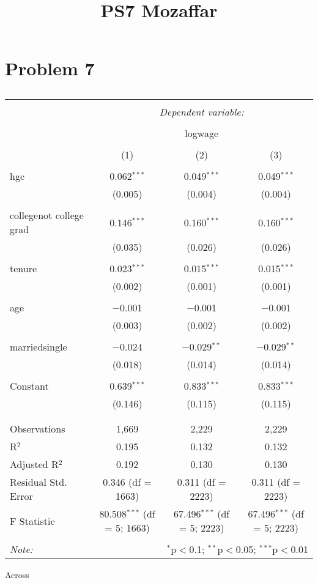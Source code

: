 \documentclass{article} \usepackage[utf8]{inputenc} \title{PS7 Mozaffar}
\begin{document}
\bigskip \section{Problem 7} \begin{table}[!htbp] \centering
  \caption{}
  \label{} \begin{tabular}{@{\extracolsep{5pt}}lccc} \\[-1.8ex]\hline 
\hline \\[-1.8ex]
 & \multicolumn{3}{c}{\textit{Dependent variable:}} \\ \cline{2-4} 
\\[-1.8ex] & \multicolumn{3}{c}{logwage} \\ \\[-1.8ex] & (1) & (2) & 
(3)\\ \hline \\[-1.8ex]
 hgc & 0.062$^{***}$ & 0.049$^{***}$ & 0.049$^{***}$ \\
  & (0.005) & (0.004) & (0.004) \\
  & & & \\
 collegenot college grad & 0.146$^{***}$ & 0.160$^{***}$ & 0.160$^{***}$ 
\\
  & (0.035) & (0.026) & (0.026) \\
  & & & \\
 tenure & 0.023$^{***}$ & 0.015$^{***}$ & 0.015$^{***}$ \\
  & (0.002) & (0.001) & (0.001) \\
  & & & \\
 age & $-$0.001 & $-$0.001 & $-$0.001 \\
  & (0.003) & (0.002) & (0.002) \\
  & & & \\
 marriedsingle & $-$0.024 & $-$0.029$^{**}$ & $-$0.029$^{**}$ \\
  & (0.018) & (0.014) & (0.014) \\
  & & & \\
 Constant & 0.639$^{***}$ & 0.833$^{***}$ & 0.833$^{***}$ \\
  & (0.146) & (0.115) & (0.115) \\
  & & & \\ \hline \\[-1.8ex] Observations & 1,669 & 2,229 & 2,229 \\ 
R$^{2}$ & 0.195 & 0.132 & 0.132 \\ Adjusted R$^{2}$ & 0.192 & 0.130 & 
0.130 \\ Residual Std. Error & 0.346 (df = 1663) & 0.311 (df = 2223) & 
0.311 (df = 2223) \\ F Statistic & 80.508$^{***}$ (df = 5; 1663) & 
67.496$^{***}$ (df = 5; 2223) & 67.496$^{***}$ (df = 5; 2223) \\ \hline 
\hline \\[-1.8ex] \textit{Note:} & \multicolumn{3}{r}{$^{*}$p$<$0.1; 
$^{**}$p$<$0.05; $^{***}$p$<$0.01} \\ \end{tabular} \end{table} Across 
\end{document}
